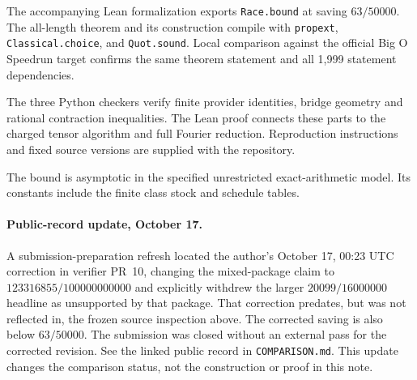 \documentclass[11pt]{amsart}
\theoremstyle{remark}
\begin{document}
The accompanying Lean formalization exports \texttt{Race.bound} at saving
$63/50000$. The all-length theorem and its construction compile with
\texttt{propext}, \texttt{Classical.choice}, and \texttt{Quot.sound}.
Local comparison against the official Big O Speedrun target confirms the
same theorem statement and all 1,999 statement dependencies.

The three Python checkers verify finite provider identities, bridge geometry
and rational contraction inequalities. The Lean proof connects these parts
to the charged tensor algorithm and full Fourier reduction. Reproduction
instructions and fixed source versions are supplied with the repository.

The bound is asymptotic in the specified unrestricted exact-arithmetic model.
Its constants include the finite class stock and schedule tables.

\paragraph{Public-record update, October 17.}
A submission-preparation refresh located the author's October 17,
00:23 UTC correction in verifier PR~10, changing the mixed-package claim to $123316855/100000000000$ and explicitly
withdrew the larger $20099/16000000$ headline as unsupported by that package.
That correction predates, but was not reflected in, the frozen source
inspection above. The corrected saving is also below $63/50000$. The submission was closed
without an external pass for the corrected revision. See the linked public
record in \texttt{COMPARISON.md}. This update changes the comparison status,
not the construction or proof in this note.



\end{document}
